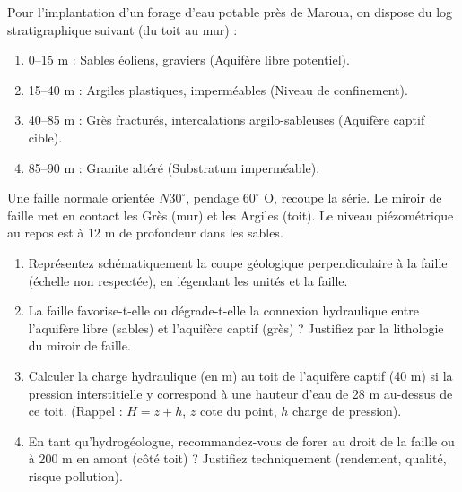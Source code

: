 \documentclass[11pt]{article}
\begin{document}
\begin{exercice}
Pour l'implantation d'un forage d'eau potable près de Maroua, on dispose du log stratigraphique suivant (du toit au mur) :
\begin{enumerate}
    \item 0--15 m : Sables éoliens, graviers (Aquifère libre potentiel).
    \item 15--40 m : Argiles plastiques, imperméables (Niveau de confinement).
    \item 40--85 m : Grès fracturés, intercalations argilo-sableuses (Aquifère captif cible).
    \item 85--90 m : Granite altéré (Substratum imperméable).
\end{enumerate}
Une faille normale orientée $N30^\circ$, pendage $60^\circ$ O, recoupe la série. Le miroir de faille met en contact les Grès (mur) et les Argiles (toit). Le niveau piézométrique au repos est à 12 m de profondeur dans les sables.
\begin{enumerate}
    \item Représentez schématiquement la coupe géologique perpendiculaire à la faille (échelle non respectée), en légendant les unités et la faille.
    \item La faille favorise-t-elle ou dégrade-t-elle la connexion hydraulique entre l'aquifère libre (sables) et l'aquifère captif (grès) ? Justifiez par la lithologie du miroir de faille.
    \item Calculer la charge hydraulique (en m) au toit de l'aquifère captif (40 m) si la pression interstitielle y correspond à une hauteur d'eau de 28 m au-dessus de ce toit. (Rappel : $H = z + h$, $z$ cote du point, $h$ charge de pression).
    \item En tant qu'hydrogéologue, recommandez-vous de forer au droit de la faille ou à 200 m en amont (côté toit) ? Justifiez techniquement (rendement, qualité, risque pollution).
\end{enumerate}
\end{exercice}
\end{document}

